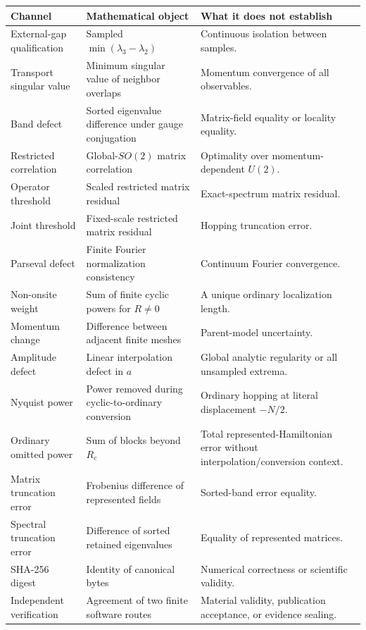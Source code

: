 \begin{longtable}{@{}p{}p{}p{}@{}}
\toprule
Channel & Mathematical object & What it does not establish\\
\midrule
\endhead
External-gap qualification & Sampled $\min(\lambda_3-\lambda_2)$ & Continuous isolation between samples.\\
Transport singular value & Minimum singular value of neighbor overlaps & Momentum convergence of all observables.\\
Band defect & Sorted eigenvalue difference under gauge conjugation & Matrix-field equality or locality equality.\\
Restricted correlation & Global-$SO(2)$ matrix correlation & Optimality over momentum-dependent $U(2)$.\\
Operator threshold & Scaled restricted matrix residual & Exact-spectrum matrix residual.\\
Joint threshold & Fixed-scale restricted matrix residual & Hopping truncation error.\\
Parseval defect & Finite Fourier normalization consistency & Continuum Fourier convergence.\\
Non-onsite weight & Sum of finite cyclic powers for $R\ne0$ & A unique ordinary localization length.\\
Momentum change & Difference between adjacent finite meshes & Parent-model uncertainty.\\
Amplitude defect & Linear interpolation defect in $a$ & Global analytic regularity or all unsampled extrema.\\
Nyquist power & Power removed during cyclic-to-ordinary conversion & Ordinary hopping at literal displacement $-N/2$.\\
Ordinary omitted power & Sum of blocks beyond $R_c$ & Total represented-Hamiltonian error without interpolation/conversion context.\\
Matrix truncation error & Frobenius difference of represented fields & Sorted-band error equality.\\
Spectral truncation error & Difference of sorted retained eigenvalues & Equality of represented matrices.\\
SHA-256 digest & Identity of canonical bytes & Numerical correctness or scientific validity.\\
Independent verification & Agreement of two finite software routes & Material validity, publication acceptance, or evidence sealing.\\
\bottomrule
\end{longtable}
